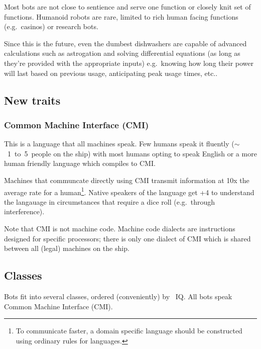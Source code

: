 \documentclass[a4paper,twocolumn]{memoir}
\begin{document}
Most bots are not close to sentience and serve one function or closely knit set of functions. Humanoid robots are rare, limited to rich human facing functions (e.g.~casinos) or research bots. 


Since this is the future, even the dumbest dishwashers are capable of advanced
calculations such as astrogation and solving differential equations (as long as
they're provided with the appropriate inputs) e.g.~knowing how long their power
will last based on previous usage, anticipating peak usage times, etc..

\subsection{New traits}
\label{sec:new-traits}

\subsubsection{Common Machine Interface (CMI)}
\label{sec:comm-mach-interf}

This is a language that all machines speak. Few humans speak it fluently
(\(\sim\)~1~to~5~people on the ship) with most humans opting to speak English or
a more human friendly language which compiles to CMI.

Machines that communcate directly using CMI transmit information at 10x the
average rate for a human\footnote{To communicate faster, a domain specific
  language should be constructed using ordinary \gurps rules for languages.
  }.
Native speakers of the language get +4 to understand the langauage in
circumstances that require a dice roll (e.g.~through interference).

Note that CMI is not machine code. Machine code dialects are instructions
designed for specific processors; there is only one dialect of CMI which is
shared between all (legal) machines on the ship.

\subsection{Classes}
\label{sec:classes}

Bots fit into several classes, ordered (conveniently) by \gurps~IQ. All bots
speak Common Machine Interface (CMI).
\end{document}

